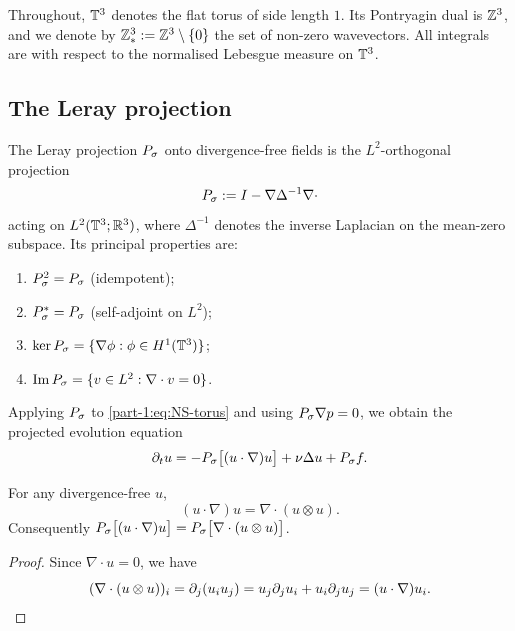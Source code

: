 \begin{notation}\label{part-1:not:torus}
Throughout, $\mathbb{T}^3$ denotes the flat torus of side length $1$. Its 
Pontryagin dual is $\mathbb{Z}^3$, and we denote by $\mathbb{Z}^3_\ast := \mathbb{Z}^3\setminus\{0\}$ 
the set of non-zero wavevectors. All integrals are with respect to the 
normalised Lebesgue measure on $\mathbb{T}^3$.
\end{notation}

\subsection{The Leray projection}
\label{part-1:ssec:leray}

The Leray projection $P_\sigma$ onto divergence-free fields is the 
$L^2$-orthogonal projection
\begin{equation}\label{part-1:eq:Leray}
P_\sigma := I - \nabla \Delta^{-1} \nabla\cdot
\end{equation}
acting on $L^2(\mathbb{T}^3;\mathbb{R}^3)$, where $\Delta^{-1}$ denotes the inverse 
Laplacian on the mean-zero subspace. Its principal properties are:
\begin{enumerate}[label=(P\arabic*),leftmargin=*]
\item $P_\sigma^2 = P_\sigma$ (idempotent);
\item $P_\sigma^* = P_\sigma$ (self-adjoint on $L^2$);
\item $\ker P_\sigma = \{\nabla \phi : \phi \in H^1(\mathbb{T}^3)\}$;
\item $\operatorname{Im}P_\sigma = \{v\in L^2 : \nabla\cdot v = 0\}$.
\end{enumerate}

Applying $P_\sigma$ to \eqref{part-1:eq:NS-torus} and using 
$P_\sigma \nabla p = 0$, we obtain the projected evolution equation
\begin{equation}\label{part-1:eq:NS-projected}
\partial_t u = -P_\sigma\bigl[(u\cdot\nabla)u\bigr] + \nu\Delta u + P_\sigma f.
\end{equation}

\begin{lemma}\label{part-1:lem:div-free-identity}
For any divergence-free $u$,
\begin{equation}\label{part-1:eq:div-identity}
(u\cdot\nabla)u = \nabla\cdot(u\otimes u).
\end{equation}
Consequently
$P_\sigma\bigl[(u\cdot\nabla)u\bigr] = P_\sigma\bigl[\nabla\cdot(u\otimes u)\bigr]$.
\end{lemma}

\begin{proof}
Since $\nabla\cdot u = 0$, we have
\begin{equation*}
(\nabla\cdot(u\otimes u))_i 
= \partial_j(u_i u_j) 
= u_j \partial_j u_i + u_i \partial_j u_j 
= (u\cdot\nabla)u_i.\qedhere
\end{equation*}
\end{proof}

